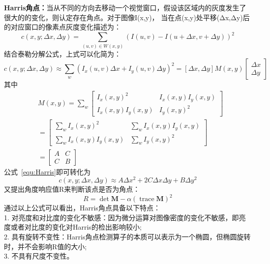 \textbf{Harris角点：}当从不同的方向去移动一个视觉窗口，假设该区域内的灰度发生了很大的的变化，则认定存在角点。对于图像I(x,y)，
当在点(x,y)处平移(Δx,Δy)后的对应窗口的像素点灰度变化描述为：
\begin{equation}
  c(x, y ; \Delta x, \Delta y)=\sum_{(u, v) \in W(x, y)} (I(u, v)-I(u+\Delta x, v+\Delta y))^{2}
  \label{equ:Harris}
\end{equation}
结合泰勒分解公式，上式可以化简为：
\begin{equation}
  c(x, y ; \Delta x, \Delta y) \approx \sum_{w}\left(I_{x}(u, v) \Delta x+I_{y}(u, v) \Delta y\right)^{2}=[\Delta x, \Delta y] M(x, y)\left[\begin{array}{c}{\Delta x} \\ {\Delta y}\end{array}\right]
\end{equation}
其中
\begin{equation}
  \begin{split}
   & M(x, y)=\sum_{w}\left[\begin{array}{cc}{I_{x}(x, y)^{2}} & {I_{x}(x, y) I_{y}(x, y)} \\ {I_{x}(x, y) I_{y}(x, y)} & {I_{y}(x, y)^{2}}\end{array}\right]\\
   & =\left[\begin{array}{cc}{\sum_{w} I_{x}(x, y)^{2}} & {\sum_{w} I_{x}(x, y) I_{y}(x, y)} \\ {\sum_{w} I_{x}(x, y) I_{y}(x, y)} & {\sum_{w} I_{y}(x, y)^{2}}\end{array}\right] \\
   & =\left[\begin{array}{cc}{A} & {C} \\ {C} & {B}\end{array}\right] 
  \end{split}
  \end{equation}
公式~\ref{equ:Harris}即可转化为
\begin{equation}
  c(x, y ; \Delta x, \Delta y) \approx A \Delta x^{2}+2 C \Delta x \Delta y+B \Delta y^{2}
\end{equation}
又提出角度响应值R来判断该点是否为角点：
\begin{equation}
  R=\operatorname{det} \boldsymbol{M}-\alpha(\operatorname{trace} \boldsymbol{M})^{2}
\end{equation}
通过以上公式可以看出，Harris角点具备以下特点：\\
1. 对亮度和对比度的变化不敏感：因为微分运算对图像密度的变化不敏感，即亮度或者对比度的变化对Harris的检出影响较小;\\
2. 具有旋转不变性：Harris角点检测算子的本质可以表示为一个椭圆，但椭圆旋转时，并不会影响R值的大小;\\
3. 不具有尺度不变性。

